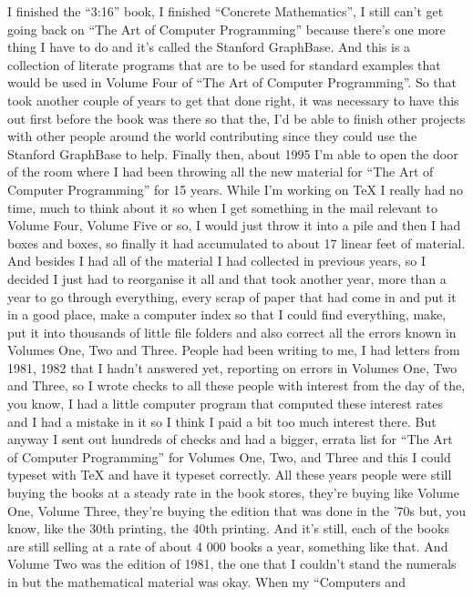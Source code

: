 \documentclass[]{article}
\begin{document}
I finished the ``3:16'' book, I finished ``Concrete Mathematics'', I
still can't get going back on ``The Art of Computer Programming''
because there's one more thing I have to do and it's called the Stanford
GraphBase. And this is a collection of literate programs that are to be
used for standard examples that would be used in Volume Four of ``The
Art of Computer Programming''. So that took another couple of years to
get that done right, it was necessary to have this out first before the
book was there so that the, I'd be able to finish other projects with
other people around the world contributing since they could use the
Stanford GraphBase to help. Finally then, about 1995 I'm able to open
the door of the room where I had been throwing all the new material for
``The Art of Computer Programming'' for 15 years. While I'm working on
TeX I really had no time, much to think about it so when I get something
in the mail relevant to Volume Four, Volume Five or so, I would just
throw it into a pile and then I had boxes and boxes, so finally it had
accumulated to about 17 linear feet of material. And besides I had all
of the material I had collected in previous years, so I decided I just
had to reorganise it all and that took another year, more than a year to
go through everything, every scrap of paper that had come in and put it
in a good place, make a computer index so that I could find everything,
make, put it into thousands of little file folders and also correct all
the errors known in Volumes One, Two and Three. People had been writing
to me, I had letters from 1981, 1982 that I hadn't answered yet,
reporting on errors in Volumes One, Two and Three, so I wrote checks to
all these people with interest from the day of the, you know, I had a
little computer program that computed these interest rates and I had a
mistake in it so I think I paid a bit too much interest there. But
anyway I sent out hundreds of checks and had a bigger, errata list for
``The Art of Computer Programming'' for Volumes One, Two, and Three and
this I could typeset with TeX and have it typeset correctly. All these
years people were still buying the books at a steady rate in the book
stores, they're buying like Volume One, Volume Three, they're buying the
edition that was done in the '70s but, you know, like the 30th printing,
the 40th printing. And it's still, each of the books are still selling
at a rate of about 4 000 books a year, something like that. And Volume
Two was the edition of 1981, the one that I couldn't stand the numerals
in but the mathematical material was okay. When my ``Computers and
\end{document}
